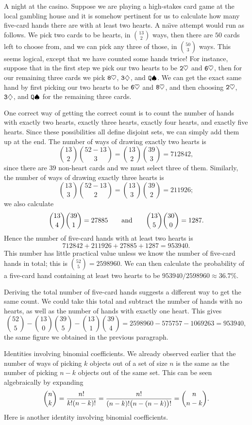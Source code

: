 \medskip\boldlabel A night at the casino.
Suppose we are playing a high-stakes card game at the local gambling
house and it is somehow pertinent for us to calculate how many five-card hands there
are with at least two hearts. A na\"\i ve attempt would run as follows. We pick two cards
to be hearts, in ${13\choose 2}$ ways, then there are $50$ cards left to choose from,
and we can pick any three of those, in ${50\choose 3}$ ways. This seems logical, except
that we have counted some hands twice! For instance, suppose that in the first step we pick
our two hearts to be $\tt2\heartsuit$ and $\tt6\heartsuit$, then for our remaining three
cards we pick $\tt8\heartsuit$, $\tt3\diamondsuit$, and $\tt Q\spadesuit$. We can get the exact
same hand by first picking our two hearts to be $\tt6\heartsuit$ and $\tt8\heartsuit$,
and then choosing $\tt2\heartsuit$, $\tt3\diamondsuit$,
and $\tt Q\spadesuit$ for the remaining three cards.

One correct way of getting the correct count is to count the number of hands with
exactly two hearts, exactly three hearts, exactly four hearts, and exactly five hearts. Since
these possibilities all define disjoint sets, we can simply add them up at the end.
The number of ways of drawing exactly two hearts is
$${13\choose 2}{52-13\choose 3} = {13\choose 2}{39\choose 3} = 712842,$$
since there are $39$ non-heart cards and we must select three of them.
Similarly, the number of ways of drawing exactly three hearts is
$${13\choose 3}{52-13\choose 2} = {13\choose 3}{39\choose 2} = 211926;$$
we also calculate
$${13\choose 4}{39\choose 1} = 27885\qquad\hbox{and}\qquad
{13\choose 5}{30\choose 0} = 1287.$$
Hence the number of five-card hands with at least two hearts is
$$712842 + 211926 + 27885 + 1287 = 953940.$$
This number has little practical value unless we know the number of five-card hands
in total; this is ${52\choose 5} = 2598960$. We can then calculate the probability
of a five-card hand containing at least two hearts to be $953940/2598960 \approx 36.7\%$.

Deriving the total number of five-card hands suggests a different way to get
the same count.
We could take this total and subtract the number
of hands with no hearts, as well as the number of hands with exactly one heart. This gives
$${52\choose 5} - {13\choose 0}{39\choose 5} - {13\choose 1}{39\choose 4}
= 2598960 - 575757 - 1069263 = 953940,$$
the same figure we obtained in the previous paragraph.

\medskip\boldlabel Identities involving binomial coefficients.
We already observed earlier that the number of ways of picking $k$ objects out of a
set of size $n$ is the same as the number of picking $n-k$ objects out of the same set.
This can be seen algebraically by expanding
$${n\choose k} = {n!\over k!(n-k)!} = {n!\over (n-k)!\bigl(n-(n-k)\bigr)!} = {n\choose n-k}.$$
Here is another identity involving binomial coefficients.

